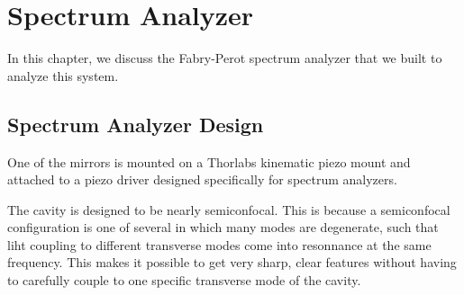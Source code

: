 \chapter{Spectrum Analyzer}
\label{Spectrum Analyzer}





In this chapter, we discuss the Fabry-Perot spectrum analyzer that we built to analyze this system. 


\section{Spectrum Analyzer Design}
One of the mirrors is mounted on a Thorlabs kinematic piezo mount and attached to a piezo driver designed specifically for spectrum analyzers.

The cavity is designed to be nearly semiconfocal.%
This is because a semiconfocal configuration is one of several in which many modes are degenerate, such that liht coupling to different transverse modes come into resonnance at the same frequency. This makes it possible to get very sharp, clear features without having to carefully couple to one specific transverse mode of the cavity. 


